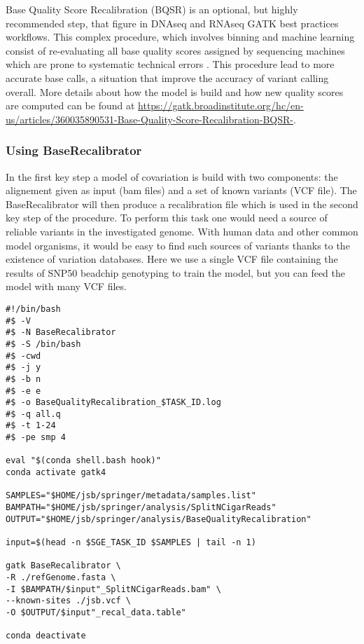 Base Quality Score Recalibration (BQSR) is an optional, but highly recommended step, that figure in DNAseq and RNAseq GATK best practices workflows. This complex procedure, which involves binning and machine learning consist of re-evaluating all base quality scores assigned by sequencing machines which are prone to systematic technical errors \cite{GATK_BaseQuality}. This procedure lead to more accurate base calls, a situation that improve the accuracy of variant calling overall. More details about how the model is build and how new quality scores are computed can be found at \href{https://gatk.broadinstitute.org/hc/en-us/articles/360035890531-Base-Quality-Score-Recalibration-BQSR-}{https://gatk.broadinstitute.org/hc/en-us/articles/360035890531-Base-Quality-Score-Recalibration-BQSR-}.

\subsubsection{Using BaseRecalibrator}

In the first key step  a model of covariation is build with two components: the alignement given as input (bam files) and a set of known variants (VCF file). The BaseRecalibrator will then produce a recalibration file which is used in the second key step of the procedure. To perform this task one would need a source of reliable variants in the investigated genome. With human data and other common model organisms, it would be easy to find such sources of variants thanks to the existence of variation databases. Here we use a single VCF file containing the results of SNP50 beadchip genotyping to train the model, but you can feed the model with many VCF files.

\begin{verbatim}
#!/bin/bash
#$ -V
#$ -N BaseRecalibrator
#$ -S /bin/bash
#$ -cwd
#$ -j y
#$ -b n
#$ -e e
#$ -o BaseQualityRecalibration_$TASK_ID.log
#$ -q all.q
#$ -t 1-24
#$ -pe smp 4

eval "$(conda shell.bash hook)"
conda activate gatk4

SAMPLES="$HOME/jsb/springer/metadata/samples.list"
BAMPATH="$HOME/jsb/springer/analysis/SplitNCigarReads"
OUTPUT="$HOME/jsb/springer/analysis/BaseQualityRecalibration"

input=$(head -n $SGE_TASK_ID $SAMPLES | tail -n 1)

gatk BaseRecalibrator \
-R ./refGenome.fasta \
-I $BAMPATH/$input"_SplitNCigarReads.bam" \
--known-sites ./jsb.vcf \
-O $OUTPUT/$input"_recal_data.table"

conda deactivate
\end{verbatim}





